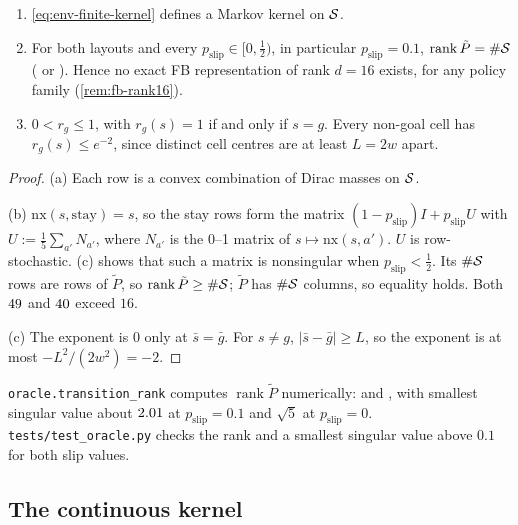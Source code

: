 \begin{proposition}\label{prop:env-finite}
\leavevmode
\begin{enumerate}[nosep,label=(\alph*)]
\item \eqref{eq:env-finite-kernel} defines a Markov kernel on $\cS$.
\item For both layouts and every $p_{\mathrm{slip}}\in[0,\frac12)$, in particular $p_{\mathrm{slip}}=0.1$, $\operatorname{rank}\tilde P=\#\cS$ ( or ).
  Hence no exact FB representation of rank $d=16$ exists, for any policy family (\cref{rem:fb-rank16}).
\item $0<r_g\le1$, with $r_g(s)=1$ if and only if $s=g$.
  Every non-goal cell has $r_g(s)\le e^{-2}$, since distinct cell centres are at least $L=2w$ apart.
\end{enumerate}
\end{proposition}
\begin{proof}
(a) Each row is a convex combination of Dirac masses on $\cS$.

(b) $\mathrm{nx}(s,\mathrm{stay})=s$, so the stay rows form the matrix $(1-p_{\mathrm{slip}})I+p_{\mathrm{slip}}U$ with $U:=\frac15\sum_{a'}N_{a'}$, where $N_{a'}$ is the 0--1 matrix of $s\mapsto\mathrm{nx}(s,a')$.
$U$ is row-stochastic. (c) shows that such a matrix is nonsingular when $p_{\mathrm{slip}}<\frac12$.
Its $\#\cS$ rows are rows of $\tilde P$, so $\operatorname{rank}\tilde P\ge\#\cS$; $\tilde P$ has $\#\cS$ columns, so equality holds.
Both $\vn{env.cells.open}{49}$ and $\vn{env.cells.4r}{40}$ exceed $16$.

(c) The exponent is $0$ only at $\bar s=\bar g$. For $s\ne g$, $\lvert\bar s-\bar g\rvert\ge L$, so the exponent is at most $-L^2/(2w^2)=-2$.
\end{proof}

\noindent\texttt{oracle.transition\_rank} computes $\operatorname{rank}\tilde P$ numerically:  and , with smallest singular value about $\vn{env.sv}{2.01}$ at $p_{\mathrm{slip}}=0.1$ and $\sqrt5$ at $p_{\mathrm{slip}}=0$. \texttt{tests/test\_oracle.py} checks the rank and a smallest singular value above $0.1$ for both slip values.

\subsection{The continuous kernel}\label{sec:env-continuous}

